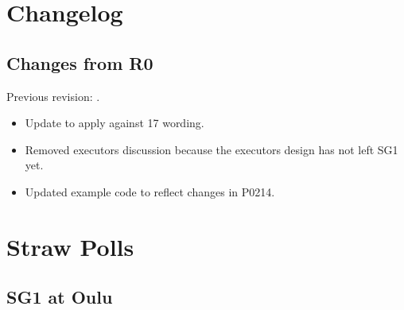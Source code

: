 \section{Changelog}
\subsection{Changes from R0}
Previous revision: \parencite{P0350R0}.
\begin{itemize}
  \item Update to apply against \CC{}17 wording.
  \item Removed executors discussion because the executors design has not left SG1 yet.
  \item Updated example code to reflect changes in P0214.
\end{itemize}

\section{Straw Polls}
\subsection{SG1 at Oulu}





